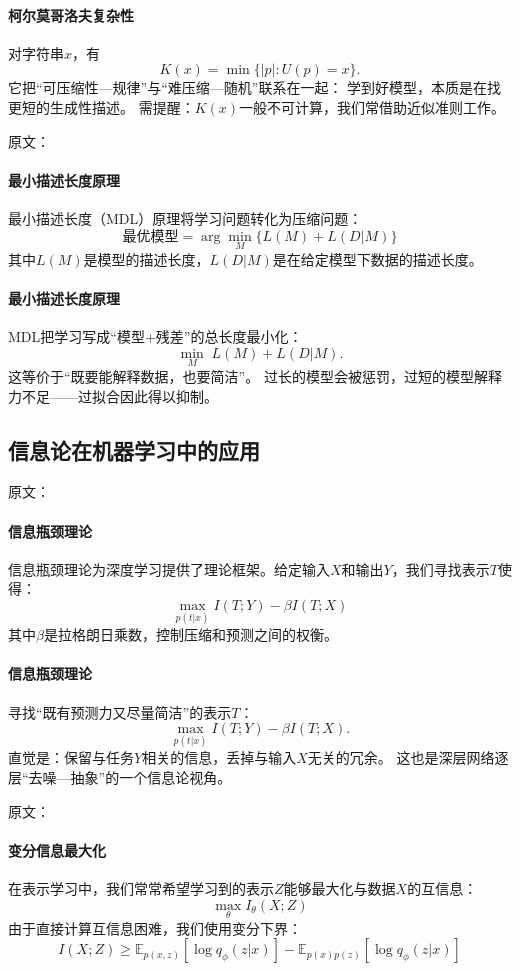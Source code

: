 \paragraph{柯尔莫哥洛夫复杂性}
对字符串$x$，有
$$K(x)=\min\{|p|:U(p)=x\}.$$
它把“可压缩性—规律”与“难压缩—随机”联系在一起：  
学到好模型，本质是在找更短的生成性描述。  
需提醒：$K(x)$一般不可计算，我们常借助近似准则工作。

原文：
\paragraph{最小描述长度原理}
最小描述长度（MDL）原理将学习问题转化为压缩问题：
$$\text{最优模型} = \arg\min_M \{L(M) + L(D|M)\}$$
其中$L(M)$是模型的描述长度，$L(D|M)$是在给定模型下数据的描述长度。
\paragraph{最小描述长度原理}
MDL把学习写成“模型+残差”的总长度最小化：
$$\min_M\;L(M)+L(D|M).$$
这等价于“既要能解释数据，也要简洁”。  
过长的模型会被惩罚，过短的模型解释力不足——\;过拟合因此得以抑制。

\subsection{信息论在机器学习中的应用}

原文：
\paragraph{信息瓶颈理论}
信息瓶颈理论为深度学习提供了理论框架。给定输入$X$和输出$Y$，我们寻找表示$T$使得：
$$\max_{p(t|x)} I(T;Y) - \beta I(T;X)$$
其中$\beta$是拉格朗日乘数，控制压缩和预测之间的权衡。
\paragraph{信息瓶颈理论}
寻找“既有预测力又尽量简洁”的表示$T$：
$$\max_{p(t|x)} I(T;Y)-\beta I(T;X).$$
直觉是：保留与任务$Y$相关的信息，丢掉与输入$X$无关的冗余。  
这也是深层网络逐层“去噪—抽象”的一个信息论视角。

原文：
\paragraph{变分信息最大化}
在表示学习中，我们常常希望学习到的表示$Z$能够最大化与数据$X$的互信息：
$$\max_{\theta} I_{\theta}(X;Z)$$
由于直接计算互信息困难，我们使用变分下界：
$$I(X;Z) \geq \mathbb{E}_{p(x,z)}[\log q_{\phi}(z|x)] - \mathbb{E}_{p(x)p(z)}[\log q_{\phi}(z|x)]$$
